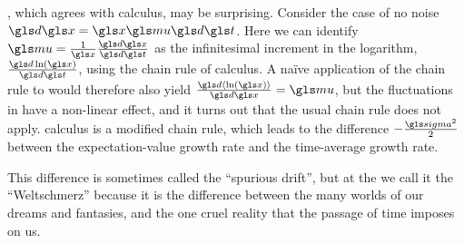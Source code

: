 , which agrees with \Ito calculus, may be surprising.
Consider the case of no noise $\gd\x=\x \gmu \gd\t$. Here we can identify $\gmu=\frac{1}{\x}\frac{\gd\x}{\gd\t}$ 
as the infinitesimal increment in the logarithm, $\frac{\gd \ln(\x)}{\gd\t}$, using the chain rule of calculus. 
A na\"ive application of the chain rule to  would therefore also yield $\frac{\gd \ave{\ln(\x)}}{\gd\x}=\gmu$, 
but the fluctuations in \GBM have a non-linear effect, and it turns out that the usual chain rule does not apply. \Ito
calculus is a modified chain rule,  which leads to the difference $-\frac{\gsigma^2}{2}$ between the 
expectation-value growth rate and the time-average
growth rate. 

This difference is sometimes called the ``spurious drift'', but at the \LML we call it the ``Weltschmerz'' because 
it is the difference between the many worlds of our dreams and fantasies, and the one cruel reality that 
the passage of time imposes on us.
